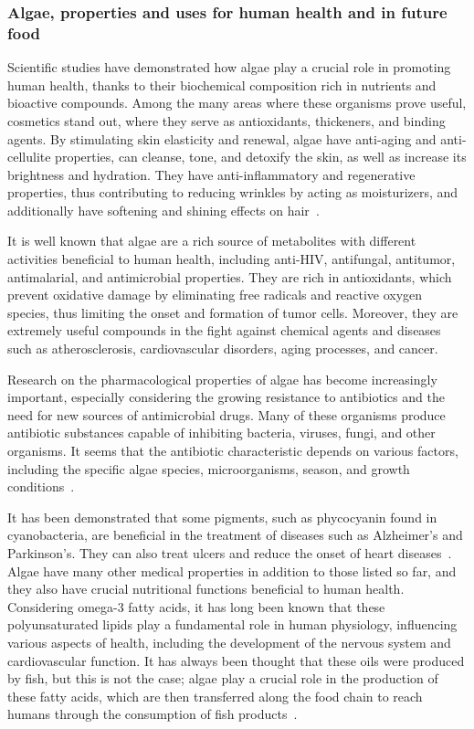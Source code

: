 \subsubsection{Algae, properties and uses for human health and in future food}
Scientific studies have demonstrated how algae play a crucial role in promoting human health, thanks to their biochemical composition rich in nutrients and bioactive compounds. Among the many areas where these organisms prove useful, cosmetics stand out, where they serve as antioxidants, thickeners, and binding agents. By stimulating skin elasticity and renewal, algae have anti-aging and anti-cellulite properties, can cleanse, tone, and detoxify the skin, as well as increase its brightness and hydration. They have anti-inflammatory and regenerative properties, thus contributing to reducing wrinkles by acting as moisturizers, and additionally have softening and shining effects on hair~\parencite{garima_diverse_2015}.

It is well known that algae are a rich source of metabolites with different activities beneficial to human health, including anti-HIV, antifungal, antitumor, antimalarial, and antimicrobial properties. They are rich in antioxidants, which prevent oxidative damage by eliminating free radicals and reactive oxygen species, thus limiting the onset and formation of tumor cells. Moreover, they are extremely useful compounds in the fight against chemical agents and diseases such as atherosclerosis, cardiovascular disorders, aging processes, and cancer. 

Research on the pharmacological properties of algae has become increasingly important, especially considering the growing resistance to antibiotics and the need for new sources of antimicrobial drugs. Many of these organisms produce antibiotic substances capable of inhibiting bacteria, viruses, fungi, and other organisms. It seems that the antibiotic characteristic depends on various factors, including the specific algae species, microorganisms, season, and growth conditions~\parencite{raja_biological_2013}.

It has been demonstrated that some pigments, such as phycocyanin found in cyanobacteria, are beneficial in the treatment of diseases such as Alzheimer's and Parkinson's. They can also treat ulcers and reduce the onset of heart diseases~\parencite{subhashini_Molecular_2004}. Algae have many other medical properties in addition to those listed so far, and they also have crucial nutritional functions beneficial to human health. Considering omega-3 fatty acids, it has long been known that these polyunsaturated lipids play a fundamental role in human physiology, influencing various aspects of health, including the development of the nervous system and cardiovascular function. It has always been thought that these oils were produced by fish, but this is not the case; algae play a crucial role in the production of these fatty acids, which are then transferred along the food chain to reach humans through the consumption of fish products~\parencite{mayfield_algae_2021}.

